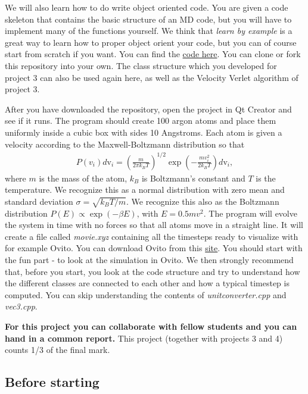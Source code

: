 \documentclass[%
oneside,                 %
final,                   %
10pt]{article}
\begin{document}
We will also learn how to do write object oriented code. You are given
a code skeleton that contains the basic structure of an MD code, but
you will have to implement many of the functions yourself. We think
that \emph{learn by example} is a great way to learn how to proper
object orient your code, but you can of course start from scratch if
you want. You can find the \href{{https://github.com/andeplane/molecular-dynamics-fys3150}}{code
here}. You
can clone or fork this repository into your own.  The class structure
which you developed for project 3 can also be used again here, as well
as the Velocity Verlet algorithm of project 3.


After you have downloaded the repository, open the project in Qt
Creator and see if it runs. The program should create 100 argon atoms
and place them uniformly inside a cubic box with sides 10
Angstroms. Each atom is given a velocity according to the
Maxwell-Boltzmann distribution so that
\begin{align} 
P(v_i)d\mathrm{v}_i = \left(\frac{m}{2\pi k_B
T}\right)^{1/2} \exp\left(-\frac{m v_i^2}{2k_B T}\right)d\mathrm{v}_i,
\end{align} 
where $m$ is the mass of the atom, $k_B$ is
Boltzmann's constant and $T$ is the temperature. We recognize this as
a normal distribution with zero mean and standard deviation $\sigma =
\sqrt{k_B T/m}$. We recognize this also as the Boltzmann distribution $P(E) \propto \exp{(-\beta E)}$, with $E = 0.5mv^2$.
The program will evolve the system in time with no
forces so that all atoms move in a straight line. It will create a
file called \emph{movie.xyz} containing all the timesteps ready to
visualize with for example Ovito. You can download Ovito from this \href{{http://www.ovito.org/index.php/download}}{site}. You should start
with the fun part - to look at the simulation in Ovito. We then
strongly recommend that, before you start, you look at the code
structure and try to understand how the different classes are
connected to each other and how a typical timestep is computed. You
can skip understanding the contents of \emph{unitconverter.cpp} and \emph{vec3.cpp}.


\textbf{For this project you can collaborate with fellow students and you can  hand in a common report.}
This project (together with projects 3 and 4) counts 1/3 of the final mark.

\subsection*{Before starting}
\end{document}
